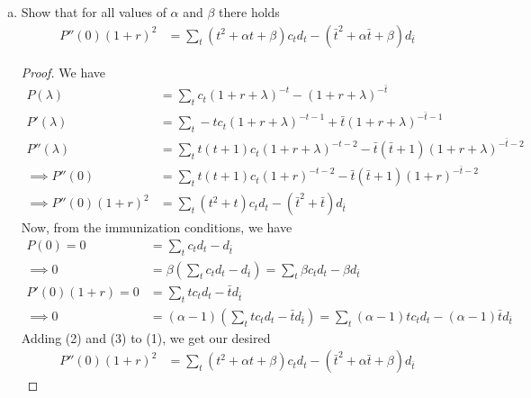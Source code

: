 \documentclass{article}
\begin{document}
\begin{enumerate}
		\begin{enumerate}[(a)]
			\item Show that for all values of $\alpha$ and $\beta$ there holds
				\begin{align*}
					P''(0)(1+r)^2 &= \sum_{t}^{}(t^2+\alpha t+\beta)c_td_t - (\bar{t}^2+\alpha\bar{t}+\beta)d_{\bar{t}}
				\end{align*}
				\begin{proof}
					We have
					\begin{align*}
						P(\lambda) &= \sum_{t}^{}c_t(1+r+\lambda)^{-t} - (1+r+\lambda)^{-\bar{t}} \\
						P'(\lambda) &= \sum_{t}^{}-tc_t(1+r+\lambda)^{-t-1} + \bar{t}(1+r+\lambda)^{-\bar{t}-1} \\
						P''(\lambda) &= \sum_{t}^{}t(t+1)c_t(1+r+\lambda)^{-t-2} - \bar{t}(\bar{t}+1)(1+r+\lambda)^{-\bar{t}-2} \\
						\implies P''(0)&= \sum_{t}^{}t(t+1)c_t(1+r)^{-t-2} - \bar{t}(\bar{t}+1)(1+r)^{-\bar{t}-2} \\
						\implies P''(0)(1+r)^2 &= \sum_{t}^{}(t^2+t)c_td_t - (\bar{t}^2+\bar{t})d_{\bar{t}} \tag{1}
					\end{align*}
					Now, from the immunization conditions, we have
					\begin{align*}
						P(0) = 0 &= \sum_{t}^{} c_td_t - d_{\bar{t}} \\
						\implies 0 &= \beta\left( \sum_{t}^{}c_td_t-d_{\bar{t}} \right) = \sum_{t}^{} \beta c_td_t - \beta d_{\bar{t}} \tag{2} \\
						P'(0)(1+r) = 0 &= \sum_{t}^{}tc_td_t-\bar{t}d_{\bar{t}} \\
						\implies 0 &= (\alpha-1)\left( \sum_{t}^{}tc_td_t-\bar{t}d_{\bar{t}} \right) = \sum_{t}^{}(\alpha-1)tc_td_t - (\alpha-1)\bar{t}d_{\bar{t}} \tag{3}
					\end{align*}
					Adding (2) and (3) to (1), we get our desired 
					\begin{align*}
						P''(0)(1+r)^2 &= \sum_{t}^{}(t^2+\alpha t + \beta)c_td_t - (\bar{t}^2+\alpha\bar{t}+\beta)d_{\bar{t}}
					\end{align*}
				\end{proof}


\end{enumerate}
\end{enumerate}
\end{document}
